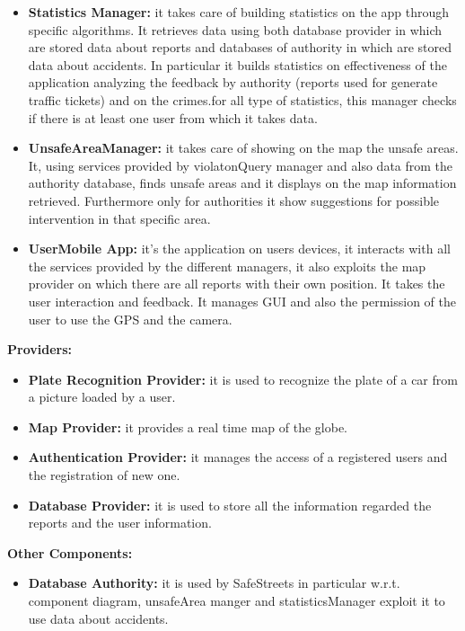 \documentclass[../RASD.tex]{subfiles}
\begin{document}
\begin{itemize}
        \item \textbf{Statistics Manager:} it takes care of building statistics on the app through specific algorithms. It retrieves data using both database provider in which are stored data about reports and databases of authority in which are stored data about accidents. In particular it builds statistics on effectiveness of the application analyzing the feedback by authority (reports used for generate traffic tickets) and on the crimes.for all type of statistics, this manager checks if there is at least one user from which it takes data.
        \item \textbf{UnsafeAreaManager:} it takes care of showing on the map the unsafe areas. It, using services provided by violatonQuery manager and also data from the authority database, finds unsafe areas and it displays on the map information retrieved. Furthermore only for authorities it show suggestions for possible intervention in that specific area.
        \item \textbf{UserMobile App:} it’s the application on users devices, it interacts with all the services provided by the different managers, it also exploits the map provider on which there are all reports with their own position. It takes the user interaction and feedback. It manages GUI and also the permission of the user to use the GPS and the camera.
    \end{itemize}

    \textbf{Providers:}
    \\
    \begin{itemize}
        \item \textbf{Plate Recognition Provider:} it is used to recognize the plate of a car from a picture loaded by a user.
        \item \textbf{Map Provider:} it provides a real time map of the globe.
        \item \textbf{Authentication Provider:} it manages the access of a registered users and the registration of new one.
        \item \textbf{Database Provider:} it is used to store all the information regarded the reports and the user information.
    \end{itemize}
    \textbf{Other Components:}
    \\
    \begin{itemize}
        \item \textbf{Database Authority:} it is used by SafeStreets in particular w.r.t. component diagram, unsafeArea manger and statisticsManager exploit it to use data about accidents.
    \end{itemize}
\end{document}
